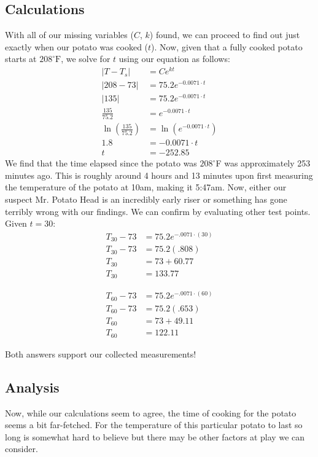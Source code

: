 \documentclass{article}
\begin{document}
\subsection{Calculations}
With all of our missing variables ($C$, $k$) found, we can proceed to find out just exactly when our potato was cooked ($t$). Now, given that a fully cooked potato starts at $208^\circ\text{F}$, we solve for $t$ using our equation as follows:
\begin{align}
    |T-T_s| &= Ce^{kt}\\[1em]
    |208 - 73| &= 75.2e^{-0.0071\cdot t}\\[1em]
    |135| &=  75.2e^{-0.0071\cdot t}\\[1em]
    \frac{135}{75.2} &= e^{-0.0071\cdot t}\\[1em]
    \ln{\left(\frac{135}{75.2}\right)} &= \ln{\left(e^{-0.0071\cdot t}\right)}\\[1em]
    1.8 &= -0.0071\cdot t\\[1em]
    t &= -252.85
\end{align}
We find that the time elapsed since the potato was $208^\circ$F was approximately 253 minutes ago. This is roughly around 4 hours and 13 minutes upon first measuring the temperature of the potato at 10am, making it 5:47am. Now, either our suspect Mr. Potato Head is an incredibly early riser or something has gone terribly wrong with our findings. We can confirm by evaluating other test points.\\ 

Given $t=30$:
\begin{align}
    T_{30}-73 &= 75.2e^{-.0071\cdot(30)}\\
    T_{30}-73 &= 75.2(.808)\\
    T_{30} &= 73+60.77\\
    T_{30} &= 133.77
\end{align}


\begin{align}
    T_{60}-73 &= 75.2e^{-.0071\cdot(60)}\\
    T_{60}-73 &= 75.2(.653)\\
    T_{60} &= 73+49.11\\
    T_{60} &= 122.11
\end{align}

Both answers support our collected measurements!

\newpage
\subsection{Analysis}
Now, while our calculations seem to agree, the time of cooking for the potato seems a bit far-fetched. For the temperature of this particular potato to last so long is somewhat hard to believe but there may be other factors at play we can consider.\\
\end{document}
